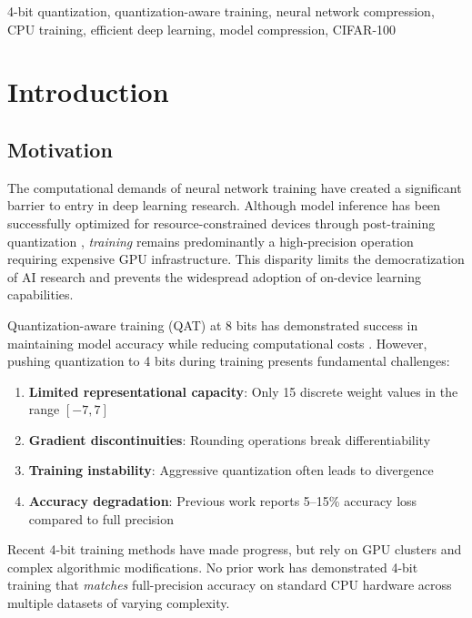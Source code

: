 \documentclass[conference]{IEEEtran}
\begin{document}
\begin{IEEEkeywords}
4-bit quantization, quantization-aware training, neural network compression, CPU training, efficient deep learning, model compression, CIFAR-100
\end{IEEEkeywords}

\section{Introduction}

\subsection{Motivation}
The computational demands of neural network training have created a significant barrier to entry in deep learning research. Although model inference has been successfully optimized for resource-constrained devices through post-training quantization \cite{jacob2018quantization, krishnamoorthi2018quantizing}, \textit{training} remains predominantly a high-precision operation requiring expensive GPU infrastructure. This disparity limits the democratization of AI research and prevents the widespread adoption of on-device learning capabilities.

Quantization-aware training (QAT) at 8 bits has demonstrated success in maintaining model accuracy while reducing computational costs \cite{choi2018pact, esser2020learned}. However, pushing quantization to 4 bits during training presents fundamental challenges:
\begin{enumerate}
    \item \textbf{Limited representational capacity}: Only 15 discrete weight values in the range $[-7, 7]$
    \item \textbf{Gradient discontinuities}: Rounding operations break differentiability
    \item \textbf{Training instability}: Aggressive quantization often leads to divergence
    \item \textbf{Accuracy degradation}: Previous work reports 5--15\% accuracy loss compared to full precision \cite{banner2019post}
\end{enumerate}

Recent 4-bit training methods \cite{sun2020ultra, dettmers2023qlora} have made progress, but rely on GPU clusters and complex algorithmic modifications. No prior work has demonstrated 4-bit training that \textit{matches} full-precision accuracy on standard CPU hardware across multiple datasets of varying complexity.
\end{document}
